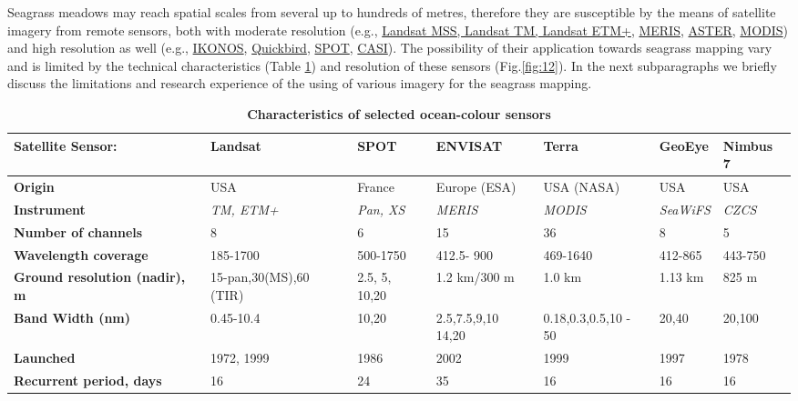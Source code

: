 \documentclass[10pt, a4paper]{article}
\begin{document}
Seagrass meadows may reach spatial scales from several up to hundreds of metres, therefore they are
susceptible by the means of satellite imagery from remote sensors, both with moderate resolution
(e.g., \href{http://landsat.gsfc.nasa.gov/}{Landsat MSS, Landsat TM, Landsat ETM+}, \href{http://envisat.esa.int/instruments/meris/}{MERIS}, \href{http://asterweb.jpl.nasa.gov/}{ASTER}, \href{http://modis.gsfc.nasa.gov/}{MODIS}) and high resolution as
well (e.g., \href{http://www.satimagingcorp.com/gallery-ikonos.html}{IKONOS}, \href{http://www.digitalglobe.com/index.php/85/QuickBird}{Quickbird}, \href{http://www.spotimage.fr/}{SPOT}, \href{http://www.itres.com/products/imagers/casi550}{CASI}). The possibility of their application towards seagrass mapping
vary and is limited by the technical characteristics (Table \ref{tab:1}) and resolution of these sensors  (Fig.\ref{fig:12}). In the next subparagraphs
we briefly discuss the limitations and research experience of the using of various imagery
for the seagrass mapping.

\begin{table}[htbp]
	\caption{\textbf{Characteristics of selected ocean-colour sensors}}
	\begin{center}
		\begin{tabular}{|p{2cm}|p{20mm}|p{15mm}|p{17mm}|p{15mm}|p{15mm}|p{15mm}|}
			\hline\hline
			\textbf{Satellite Sensor:} & {\textbf{Landsat}} & {\textbf{SPOT}} & {\textbf{ENVISAT}} & {\textbf{Terra}} & {\textbf{GeoEye}} & {\textbf{Nimbus 7}} \\ \hline\hline
				\textbf{Origin} & USA & France & Europe (ESA) & USA (NASA) & USA & USA \\ \hline
				\textbf{Instrument} & \textit{TM, ETM+} & \textit{Pan, XS} & \textit{MERIS} & \textit{MODIS} & \textit{SeaWiFS} & \textit{CZCS}\\ \hline
			\textbf{Number of channels} & 8 & 6 & 15 & 36 & 8 & 5 \\ \hline
			\textbf{Wavelength coverage} & 185-1700 & 500-1750 & 412.5- 900 & 469-1640 & 412-865 & 443-750 \\ \hline
			\textbf{Ground resolution (nadir), m} & 15-pan,30(MS),60 (TIR) & 2.5, 5, 10,20 & 1.2 km/300 m & 1.0 km & 1.13 km & 825 m \\ \hline
			\textbf{Band Width (nm)} & 0.45-10.4 & 10,20 & 2.5,7.5,9,10 14,20 & 0.18,0.3,0.5,10 - 50 & 20,40 & 20,100 \\ \hline
			\textbf{Launched} & 1972, 1999 & 1986 & 2002 & 1999 & 1997 & 1978 \\ \hline
			\textbf{Recurrent period, days} & 16 & 24 & 35 & 16 & 16 & 16 \\ \hline
		\end{tabular}
	\end{center}
	\label{tab:1}
\end{table}
\end{document}
